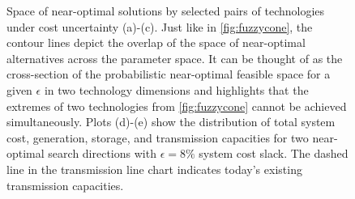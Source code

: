 \begin{figure}
    \noindent{}
    \noindent{}
    \vspace{1cm}
    \caption{
      Space of near-optimal solutions by selected pairs of technologies
      under cost uncertainty (a)-(c). Just like in \cref{fig:fuzzycone}, the
      contour lines depict the overlap of the space of near-optimal alternatives
      across the parameter space. It can be thought of as the cross-section of
      the probabilistic near-optimal feasible space for a given $\epsilon$ in
      two technology dimensions and highlights that the extremes of two
      technologies from \cref{fig:fuzzycone} cannot be achieved simultaneously.
      Plots (d)-(e) show the distribution of total system cost, generation,
      storage, and transmission capacities for two near-optimal search
      directions with $\epsilon=8\%$ system cost slack. The dashed line in the
      transmission line chart indicates today's existing transmission
      capacities.
    }
    \label{fig:dependencies}
\end{figure}

